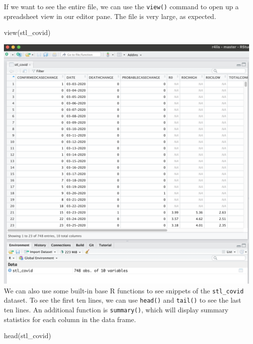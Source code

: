 \documentclass[
  krantz2]{krantz}
\makeatletter
\newenvironment{Shaded}{\begin{snugshade}}{\end{snugshade}}
\newcommand{\FunctionTok}[1]{\textcolor[rgb]{0,0,0}{#1}}
\newcommand{\NormalTok}[1]{#1}
\newenvironment{kframe}{%
\medskip{}
\setlength{\fboxsep}{.8em}
 \def\at@end@of@kframe{}%
 \ifinner\ifhmode%
  \def\at@end@of@kframe{\end{minipage}}%
  \begin{minipage}{\columnwidth}%
 \fi\fi%
 \def\FrameCommand##1{\hskip\@totalleftmargin \hskip-\fboxsep
 \colorbox{shadecolor}{##1}\hskip-\fboxsep
     \hskip-\linewidth \hskip-\@totalleftmargin \hskip\columnwidth}%
 \MakeFramed {\advance\hsize-\width
   \@totalleftmargin\z@ \linewidth\hsize
   \@setminipage}}%
 {\par\unskip\endMakeFramed%
 \at@end@of@kframe}
\renewenvironment{Shaded}{\begin{kframe}}{\end{kframe}}
\makeatother
\begin{document}
If we want to see the entire file, we can use the \texttt{view()} command to open up a spreadsheet view in our editor pane. The file is very large, as expected.

\begin{Shaded}
\begin{Highlighting}[]
\FunctionTok{view}\NormalTok{(stl\_covid)}
\end{Highlighting}
\end{Shaded}

\includegraphics{images/view-covid.png}
We can also use some built-in base R functions to see snippets of the \texttt{stl\_covid} dataset. To see the first ten lines, we can use \texttt{head()} and \texttt{tail()} to see the last ten lines. An additional function is \texttt{summary()}, which will display summary statistics for each column in the data frame.

\begin{Shaded}
\begin{Highlighting}[]
\FunctionTok{head}\NormalTok{(stl\_covid)}
\end{Highlighting}
\end{Shaded}
\end{document}

